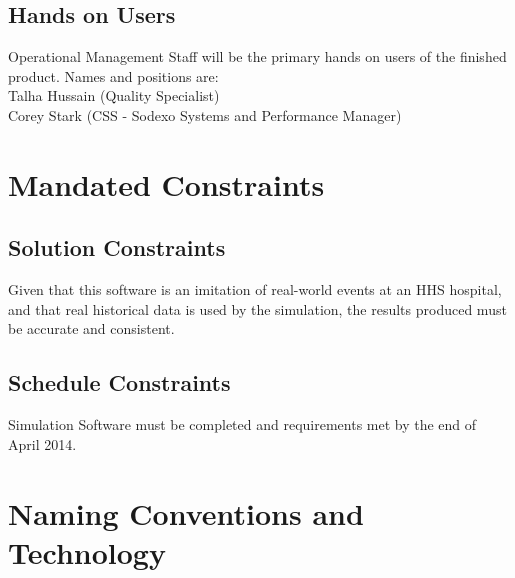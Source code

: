 \documentclass[paper=letter, fontsize=10pt]{scrartcl}
\numberwithin{equation}{section}		%
\numberwithin{figure}{section}			%
\numberwithin{table}{section}				%
\begin{document}
\subsection{Hands on Users}
Operational Management Staff will be the primary hands on users of the finished product. Names and positions are: \\
Talha Hussain (Quality Specialist)\\
Corey Stark (CSS - Sodexo Systems and Performance Manager)

\section{Mandated Constraints}
\subsection{Solution Constraints}
Given that this software is an imitation of real-world events at an HHS hospital, and that real historical data is used by the simulation, the results produced must be accurate and consistent.
\subsection{Schedule Constraints}
Simulation Software must be completed and requirements met by the end of April 2014.  

\section{Naming Conventions and Technology}
\end{document}
